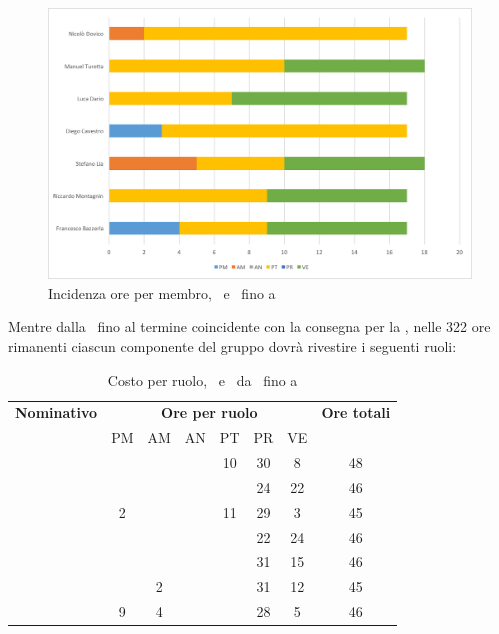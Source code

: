 \begin{figure}[H]
	\centering 
	\includegraphics[scale=0.7]{Immagini/GraficiPianoLavoro/PD.png}
	\caption{Incidenza ore per membro, \PD\ e \COD\ fino a \RP}
\end{figure}

\newpage
Mentre dalla \RP\ fino al termine coincidente con la consegna per la \RQ, nelle 322 ore rimanenti ciascun componente del gruppo dovrà rivestire i seguenti ruoli:

\begin{table}[h]
	\begin{center}
		\begin{tabular}{|c|c|c|c|c|c|c|c|}
			\hline
			\textbf{Nominativo} & \multicolumn{6}{c|}{\textbf{Ore per ruolo}} & \textbf{Ore totali} \\
					& PM & AM & AN & PT & PR & VE & \\
			\hline
			\FB		&	 &	  &	   & 10	& 30 &	8  &	48	\\
			\hline
			\RM		&	 &	  &	   & 	& 24 & 22 & 46	\\
			\hline
			\SL		& 2  &	  &	   & 11	& 29 & 3  &	45	\\
			\hline
			\DC		&	 &	  &	   &	& 22 & 24 &	46	\\
			\hline
			\LD 	&	 &	  &	   &	& 31 & 15 &	46	\\
			\hline
			\MT		& 	 & 2  &	   &	& 31 & 12  &	45	\\
			\hline
			\ND 	& 9	 & 4  &	   &	& 28 & 5   & 46	\\
			\hline
		\end{tabular}
	\end{center}
	\caption{Costo per ruolo, \PD\ e \COD\ da \RP\ fino a \RQ}
\end{table}


